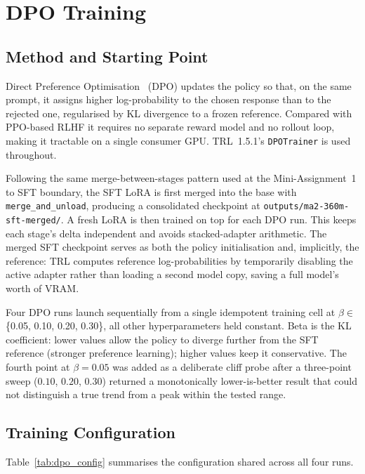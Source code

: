 \documentclass[../main.tex]{subfiles}
\begin{document}
\section{DPO Training}
\label{sec:dpo}

\subsection{Method and Starting Point}
\label{sec:dpo_method}

Direct Preference Optimisation~\cite{rafailov2023dpo} (DPO) updates the policy so that, on the same prompt, it assigns higher log-probability to the chosen response than to the rejected one, regularised by KL divergence to a frozen reference. Compared with PPO-based RLHF it requires no separate reward model and no rollout loop, making it tractable on a single consumer GPU. TRL~1.5.1's \texttt{DPOTrainer} is used throughout.

Following the same merge-between-stages pattern used at the Mini-Assignment~1 to SFT boundary, the SFT LoRA is first merged into the base with \texttt{merge\_and\_unload}, producing a consolidated checkpoint at \texttt{outputs/ma2-360m-sft-merged/}. A fresh LoRA is then trained on top for each DPO run. This keeps each stage's delta independent and avoids stacked-adapter arithmetic. The merged SFT checkpoint serves as both the policy initialisation and, implicitly, the reference: TRL computes reference log-probabilities by temporarily disabling the active adapter rather than loading a second model copy, saving a full model's worth of VRAM.

Four DPO runs launch sequentially from a single idempotent training cell at $\beta \in $\{0.05, 0.10, 0.20, 0.30\}, all other hyperparameters held constant. Beta is the KL coefficient: lower values allow the policy to diverge further from the SFT reference (stronger preference learning); higher values keep it conservative. The fourth point at $\beta = 0.05$ was added as a deliberate cliff probe after a three-point sweep ($0.10$, $0.20$, $0.30$) returned a monotonically lower-is-better result that could not distinguish a true trend from a peak within the tested range.

\subsection{Training Configuration}
\label{sec:dpo_config}

Table~\ref{tab:dpo_config} summarises the configuration shared across all four runs.
\end{document}
